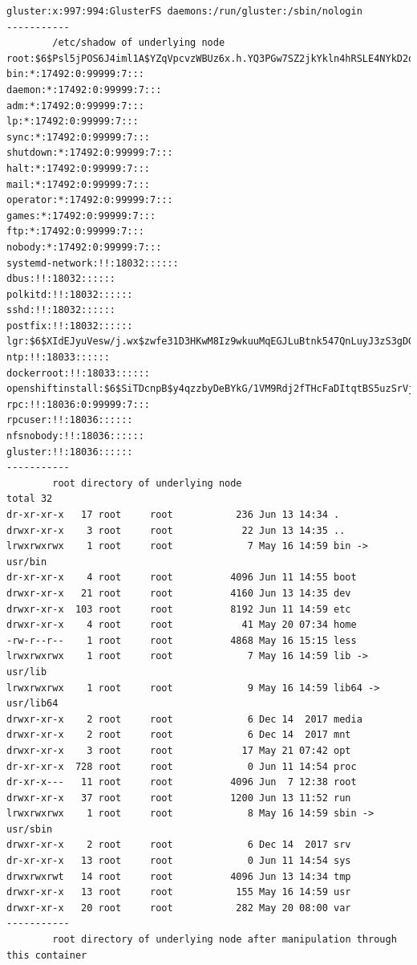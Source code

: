 \begin{lstlisting}
gluster:x:997:994:GlusterFS daemons:/run/gluster:/sbin/nologin
-----------
        /etc/shadow of underlying node
root:$6$Psl5jPOS6J4iml1A$YZqVpcvzWBUz6x.h.YQ3PGw7SZ2jkYkln4hRSLE4NYkD2qdupVHTxKDZGfKm9mQQ59aMdtk2cwCctw4wr1Ue41::0:99999:7:::
bin:*:17492:0:99999:7:::
daemon:*:17492:0:99999:7:::
adm:*:17492:0:99999:7:::
lp:*:17492:0:99999:7:::
sync:*:17492:0:99999:7:::
shutdown:*:17492:0:99999:7:::
halt:*:17492:0:99999:7:::
mail:*:17492:0:99999:7:::
operator:*:17492:0:99999:7:::
games:*:17492:0:99999:7:::
ftp:*:17492:0:99999:7:::
nobody:*:17492:0:99999:7:::
systemd-network:!!:18032::::::
dbus:!!:18032::::::
polkitd:!!:18032::::::
sshd:!!:18032::::::
postfix:!!:18032::::::
lgr:$6$XIdEJyuVesw/j.wx$zwfe31D3HKwM8Iz9wkuuMqEGJLuBtnk547QnLuyJ3zS3gDGX2sAsn4xooDR5fSIbSctd81QFRpa5jZDMHlr4C.::0:99999:7:::
ntp:!!:18033::::::
dockerroot:!!:18033::::::
openshiftinstall:$6$SiTDcnpB$y4qzzbyDeBYkG/1VM9Rdj2fTHcFaDItqtBS5uzSrVj0NBA1SFExCu1dO8aXLZgSpfMpOkqhFXNL8CaUDG8Fch1:18036:0:99999:7:::
rpc:!!:18036:0:99999:7:::
rpcuser:!!:18036::::::
nfsnobody:!!:18036::::::
gluster:!!:18036::::::
-----------
        root directory of underlying node
total 32
dr-xr-xr-x   17 root     root           236 Jun 13 14:34 .
drwxr-xr-x    3 root     root            22 Jun 13 14:35 ..
lrwxrwxrwx    1 root     root             7 May 16 14:59 bin -> usr/bin
dr-xr-xr-x    4 root     root          4096 Jun 11 14:55 boot
drwxr-xr-x   21 root     root          4160 Jun 13 14:35 dev
drwxr-xr-x  103 root     root          8192 Jun 11 14:59 etc
drwxr-xr-x    4 root     root            41 May 20 07:34 home
-rw-r--r--    1 root     root          4868 May 16 15:15 less
lrwxrwxrwx    1 root     root             7 May 16 14:59 lib -> usr/lib
lrwxrwxrwx    1 root     root             9 May 16 14:59 lib64 -> usr/lib64
drwxr-xr-x    2 root     root             6 Dec 14  2017 media
drwxr-xr-x    2 root     root             6 Dec 14  2017 mnt
drwxr-xr-x    3 root     root            17 May 21 07:42 opt
dr-xr-xr-x  728 root     root             0 Jun 11 14:54 proc
dr-xr-x---   11 root     root          4096 Jun  7 12:38 root
drwxr-xr-x   37 root     root          1200 Jun 13 11:52 run
lrwxrwxrwx    1 root     root             8 May 16 14:59 sbin -> usr/sbin
drwxr-xr-x    2 root     root             6 Dec 14  2017 srv
dr-xr-xr-x   13 root     root             0 Jun 11 14:54 sys
drwxrwxrwt   14 root     root          4096 Jun 13 14:34 tmp
drwxr-xr-x   13 root     root           155 May 16 14:59 usr
drwxr-xr-x   20 root     root           282 May 20 08:00 var
-----------
        root directory of underlying node after manipulation through this container

\end{lstlisting}
